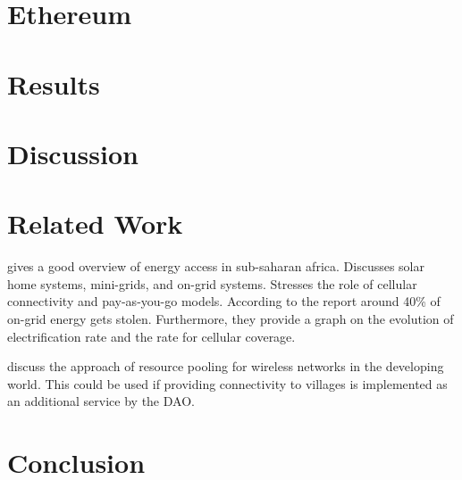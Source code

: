 \section{Ethereum}

\section{Results}

\section{Discussion}

\section{Related Work}

\cite{gsma2014} gives a good overview of energy access in sub-saharan africa. Discusses solar home systems, mini-grids, and on-grid systems. Stresses the role of cellular connectivity and pay-as-you-go models. According to the report around 40\% of on-grid energy gets stolen. Furthermore, they provide a graph on the evolution of electrification rate and the rate for cellular coverage.

\cite{DBLP:journals/corr/QadirSWC16} discuss the approach of resource pooling for wireless networks in the developing world. This could be used if providing connectivity to villages is implemented as an additional service by the DAO.

\section{Conclusion}


